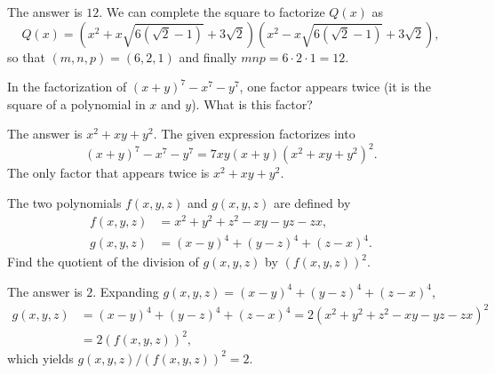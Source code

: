 \documentclass[12pt,a4paper]{memoir}
\theoremstyle{definition}
\begin{document}
	\begin{solution}%
		The answer is $12$. We can complete the square to factorize $Q(x)$ as $$Q(x)=\left(x^2+x\sqrt{6(\sqrt{2}-1)}+3\sqrt{2}\right)\left(x^2-x\sqrt{6(\sqrt{2}-1)}+3\sqrt{2}\right),$$ so that $(m,n,p)=(6,2,1)$ and finally $mnp=6\cdot 2 \cdot 1 = \boxed{12}$.
	\end{solution}
	
	
	
	
	
	\setcounter{question}{61}
	
	
	\begin{tcolorbox}
		\begin{question}
			In the factorization of $(x+y)^7 - x^7 - y^7$, one factor appears twice (it is the square of a polynomial in $x$ and $y$). What is this factor? 
		\end{question}
	\end{tcolorbox}
	
	\begin{solution}
		The answer is $x^2+xy+y^2$. The given expression factorizes into $$(x+y)^7 - x^7 - y^7=7xy(x+y)(x^2+xy+y^2)^2.$$ The only factor that appears twice is $\boxed{x^2+xy+y^2}$.
	\end{solution}
	

	\setcounter{question}{78}	
	

\begin{tcolorbox}
	\SetupExSheets{headings=runin}
	\begin{question}
		The two polynomials $f(x,y,z)$ and $g(x,y,z)$ are defined by
		\begin{align*}
			f(x,y,z) &= x^2+y^2+z^2-xy-yz-zx,\\
			g(x,y,z) &= (x-y)^4+(y-z)^4+(z-x)^4.
		\end{align*}
		Find the quotient of the division of $g(x,y,z)$ by $(f(x,y,z))^2$.
	\end{question}
\end{tcolorbox}

\begin{solution}
	The answer is $2$. Expanding $g(x,y,z)=(x-y)^4+(y-z)^4+(z-x)^4$,
	\begin{align*}
		g(x,y,z) &= (x-y)^4+(y-z)^4+(z-x)^4 = 2(x^2+y^2+z^2-xy-yz-zx)^2 \\ &= 2(f(x,y,z))^2,
	\end{align*}
	which yields $g(x,y,z)/(f(x,y,z))^2=\boxed{2}$.
\end{solution}
\end{document}
